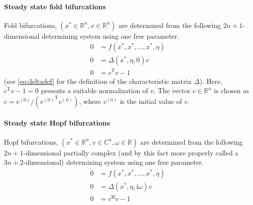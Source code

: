 \documentclass[10pt]{scrartcl}
\renewcommand{\i}{\mathrm{i}}
\newcommand{\T}{\mathrm{T}}
\renewcommand{\H}{\mathrm{H}}
\newcommand{\RR}{\mathbb{R}}
\newcommand{\CC}{\mathbb{C}}
\begin{document}
{\paragraph{Steady state fold bifurcations}
Fold bifurcations, $(x^*\in\RR^n,v\in\RR^n)$ are determined 
from the following
$2n+1$-dimensional determining system using one free
parameter.
\begin{equation}\label{determ_fold}
\begin{aligned}
0&=f(x^*,x^*,\ldots,x^*,\eta) \\
0&=\Delta(x^*,\eta,0)v\\
0&=c^\T v-1
\end{aligned}
\end{equation}
(see \eqref{eq:deltadef} for the definition of the characteristic
matrix $\Delta$). Here, $c^\T v-1=0$ presents a suitable normalization
of $v$.  The vector $c\in\RR^n$ is chosen as $c=v^{(0)}/({v^{(0)}}^\T
v^{(0)})$, where $v^{(0)}$ is the initial value of $v$.

\paragraph{Steady state Hopf bifurcations}
Hopf bifurcations, $(x^*\in\RR^n,v\in\CC^n,\omega\in\RR)$ are
determined from the following $2n+1$-dimensional partially complex
(and by this fact more properly called a $3n+2$-dimensional)
determining system using one free parameter.
\begin{equation}\label{determ_hopf}
\begin{aligned}
0&=f(x^*,x^*,\ldots,x^*,\eta)\\
0&=\Delta(x^*,\eta,\i\omega)v\\
0&=c^\H v-1\\
\end{aligned}
\end{equation}

}
\end{document}
